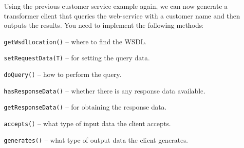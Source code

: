 \documentclass[a4paper]{book}
\begin{document}
Using the previous customer service example again, we can now generate a
transformer client that queries the web-service with a customer name and
then outputs the results. You need to implement the following methods:
\begin{tight_itemize}
	\item \texttt{getWsdlLocation()} -- where to find the WSDL.
	\item \texttt{setRequestData(T)} -- for setting the query data.
	\item \texttt{doQuery()} -- how to perform the query.
	\item \texttt{hasResponseData()} -- whether there is any response data
	available.
	\item \texttt{getResponseData()} -- for obtaining the response data.
	\item \texttt{accepts()} -- what type of input data the client accepts.
	\item \texttt{generates()} -- what type of output data the client generates.
\end{tight_itemize}
\end{document}
